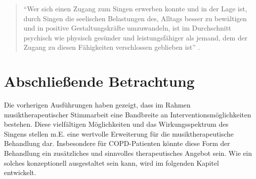 \begin{quote}
\onehalfspacing
"`Wer sich einen Zugang zum Singen erwerben konnte und in der Lage ist, durch Singen die seelischen Belastungen des, Alltags besser zu bewältigen und in positive Gestaltungskräfte umzuwandeln, ist im Durchschnitt psychisch wie physisch gesünder und leistungsfähiger als jemand, dem der Zugang zu diesen Fähigkeiten verschlossen geblieben ist"' \autocite[93ff.]{adamek1997}. 
\end{quote}

\section{Abschließende Betrachtung}
Die vorherigen Ausführungen haben gezeigt, dass im Rahmen musiktherapeutischer Stimmarbeit eine Bandbreite an Interventionsmöglichkeiten bestehen. Diese vielfältigen Möglichkeiten und das Wirkungsspektrum des Singens stellen m.E. eine wertvolle Erweiterung für die musiktherapeutische Behandlung dar. Insbesondere für COPD-Patienten könnte diese Form der Behandlung ein zusätzliches und sinnvolles therapeutisches Angebot sein. Wie ein solches konzeptionell ausgestaltet sein kann, wird im folgenden Kapitel entwickelt.



\newpage\thispagestyle{empty}

